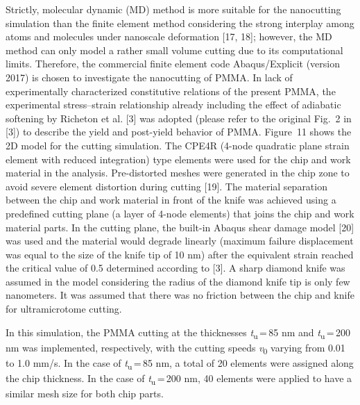 \documentclass{article}
\begin{document}
Strictly, molecular dynamic (MD) method is more suitable for the nanocutting simulation than the finite element method considering the strong interplay among atoms and molecules under nanoscale deformation [17, 18]; however, the MD method can only model a rather small volume cutting due to its computational limits. Therefore, the commercial finite element code Abaqus/Explicit (version 2017) is chosen to investigate the nanocutting of PMMA. In lack of experimentally characterized constitutive relations of the present PMMA, the experimental stress–strain relationship already including the effect of adiabatic softening by Richeton et al. [3] was adopted (please refer to the original Fig.~2 in [3]) to describe the yield and post-yield behavior of PMMA. Figure~11 shows the 2D model for the cutting simulation. The CPE4R (4-node quadratic plane strain element with reduced integration) type elements were used for the chip and work material in the analysis. Pre-distorted meshes were generated in the chip zone to avoid severe element distortion during cutting [19]. The material separation between the chip and work material in front of the knife was achieved using a predefined cutting plane (a layer of 4-node elements) that joins the chip and work material parts. In the cutting plane, the built-in Abaqus shear damage model [20] was used and the material would degrade linearly (maximum failure displacement was equal to the size of the knife tip of 10 nm) after the equivalent strain reached the critical value of 0.5 determined according to [3]. A sharp diamond knife was assumed in the model considering the radius of the diamond knife tip is only few nanometers. It was assumed that there was no friction between the chip and knife for ultramicrotome cutting.

In this simulation, the PMMA cutting at the thicknesses \emph{t}\textsubscript{u}\,=\,85 nm and \emph{t}\textsubscript{u}\,=\,200 nm was implemented, respectively, with the cutting speeds \emph{v}\textsubscript{0} varying from 0.01 to 1.0 mm/s. In the case of \emph{t}\textsubscript{u}\,=\,85 nm, a total of 20 elements were assigned along the chip thickness. In the case of \emph{t}\textsubscript{u}\,=\,200 nm, 40 elements were applied to have a similar mesh size for both chip parts.
\end{document}
